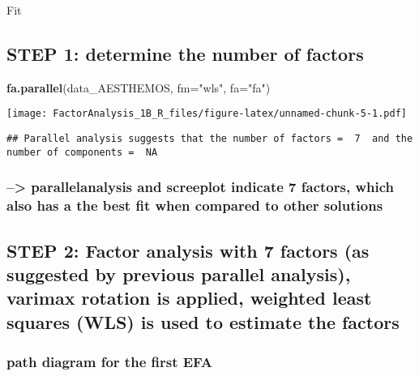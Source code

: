 \documentclass[
]{article}
\newenvironment{Shaded}{\begin{snugshade}}{\end{snugshade}}
\newcommand{\DataTypeTok}[1]{\textcolor[rgb]{0.13,0.29,0.53}{#1}}
\newcommand{\KeywordTok}[1]{\textcolor[rgb]{0.13,0.29,0.53}{\textbf{#1}}}
\newcommand{\NormalTok}[1]{#1}
\newcommand{\StringTok}[1]{\textcolor[rgb]{0.31,0.60,0.02}{#1}}
\begin{document}
Fit

\hypertarget{step-1-determine-the-number-of-factors}{%
\subsection{STEP 1: determine the number of
factors}\label{step-1-determine-the-number-of-factors}}

\begin{Shaded}
\begin{Highlighting}[]
\KeywordTok{fa.parallel}\NormalTok{(data\_AESTHEMOS,  }\DataTypeTok{fm=}\StringTok{"wls"}\NormalTok{, }\DataTypeTok{fa=}\StringTok{"fa"}\NormalTok{)}
\end{Highlighting}
\end{Shaded}

\texttt{[image: FactorAnalysis\_1B\_R\_files/figure-latex/unnamed-chunk-5-1.pdf]}

\begin{verbatim}
## Parallel analysis suggests that the number of factors =  7  and the number of components =  NA
\end{verbatim}

\hypertarget{parallelanalysis-and-screeplot-indicate-7-factors-which-also-has-a-the-best-fit-when-compared-to-other-solutions}{%
\subsubsection{--\textgreater{} parallelanalysis and screeplot indicate
7 factors, which also has a the best fit when compared to other
solutions}\label{parallelanalysis-and-screeplot-indicate-7-factors-which-also-has-a-the-best-fit-when-compared-to-other-solutions}}

\hypertarget{step-2-factor-analysis-with-7-factors-as-suggested-by-previous-parallel-analysis-varimax-rotation-is-applied-weighted-least-squares-wls-is-used-to-estimate-the-factors}{%
\subsection{STEP 2: Factor analysis with 7 factors (as suggested by
previous parallel analysis), varimax rotation is applied, weighted least
squares (WLS) is used to estimate the
factors}\label{step-2-factor-analysis-with-7-factors-as-suggested-by-previous-parallel-analysis-varimax-rotation-is-applied-weighted-least-squares-wls-is-used-to-estimate-the-factors}}

\hypertarget{path-diagram-for-the-first-efa}{%
\subsubsection{path diagram for the first
EFA}\label{path-diagram-for-the-first-efa}}
\end{document}
